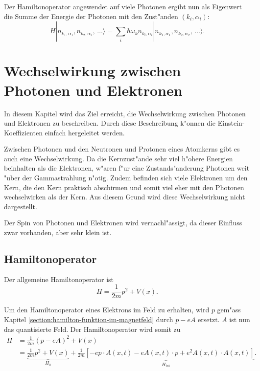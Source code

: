 \begin{refsection}
Der Hamiltonoperator angewendet auf viele Photonen ergibt nun als Eigenwert die Summe der Energie der Photonen mit den Zust"anden $(k_i,\alpha_i)$:
\begin{equation*}
H |n_{k_1,\alpha_1}, n_{k_2,\alpha_2}, \, \hdots\rangle = \sum_i \hbar \omega_k n_{k_i,\alpha_i} |n_{k_1,\alpha_1}, n_{k_2,\alpha_2}, \, \hdots\rangle.
\end{equation*}

\section{Wechselwirkung zwischen Photonen und Elektronen}

In diesem Kapitel wird das Ziel erreicht, die Wechselwirkung zwischen Photonen und Elektronen zu beschreiben. Durch diese Beschreibung k"onnen die Einstein-Koeffizienten einfach hergeleitet werden.

Zwischen Photonen und den Neutronen und Protonen eines Atomkerns gibt es auch eine Wechselwirkung. Da die Kernzust"ande sehr viel h"ohere Energien beinhalten als die Elektronen, w"aren f"ur eine Zustands"anderung Photonen weit "uber der Gammastrahlung n"otig. Zudem befinden sich viele Elektronen um den Kern, die den Kern praktisch abschirmen und somit viel eher mit den Photonen wechselwirken als der Kern. Aus diesem Grund wird diese Wechselwirkung nicht dargestellt.

Der Spin von Photonen und Elektronen wird vernachl"assigt, da dieser Einfluss zwar vorhanden, aber sehr klein ist.

\subsection{Hamiltonoperator}

Der allgemeine Hamiltonoperator ist
\begin{equation*}
H = \frac{1}{2m}p^2 + V(x).
\end{equation*}

Um den Hamiltonoperator eines Elektrons im Feld zu erhalten, wird $p$ gem"ass Kapitel \ref{section:hamilton-funktion-im-magnetfeld} durch $p - eA$ ersetzt. $A$ ist nun das quantisierte Feld. Der Hamiltonoperator wird somit zu
\begin{equation*}
\begin{split}
H &= \frac{1}{2m}(p - eA)^2 + V(x)\\
 &= \underbrace{\frac{1}{2m}p^2 + V(x)}_{H_0} + \underbrace{\frac{1}{2m}\left[- e p \cdot A(x, t) - e A(x, t) \cdot p + e^2 A(x, t) \cdot A(x, t) \right]}_{H_{\text{int}}}.
\end{split}
\end{equation*}


\end{refsection}
